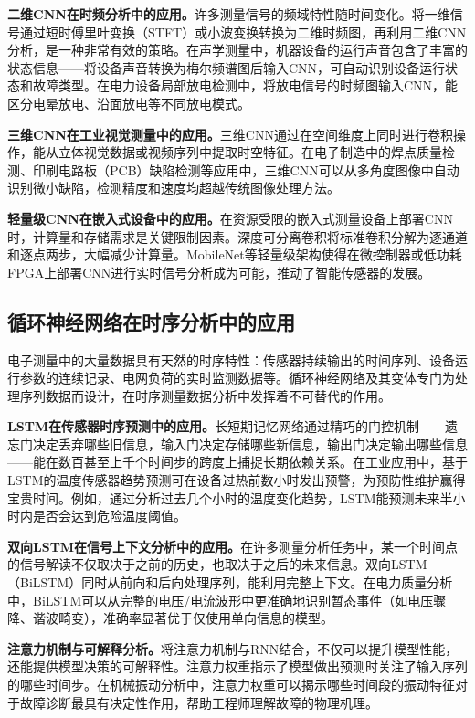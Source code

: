 \documentclass[12pt,a4paper]{article}
\numberwithin{figure}{section}
\numberwithin{table}{section}
\numberwithin{equation}{section}
\begin{document}
\textbf{二维CNN在时频分析中的应用。}许多测量信号的频域特性随时间变化。将一维信号通过短时傅里叶变换（STFT）或小波变换转换为二维时频图，再利用二维CNN分析，是一种非常有效的策略。在声学测量中，机器设备的运行声音包含了丰富的状态信息——将设备声音转换为梅尔频谱图后输入CNN，可自动识别设备运行状态和故障类型。在电力设备局部放电检测中，将放电信号的时频图输入CNN，能区分电晕放电、沿面放电等不同放电模式。

\textbf{三维CNN在工业视觉测量中的应用。}三维CNN通过在空间维度上同时进行卷积操作，能从立体视觉数据或视频序列中提取时空特征。在电子制造中的焊点质量检测、印刷电路板（PCB）缺陷检测等应用中，三维CNN可以从多角度图像中自动识别微小缺陷，检测精度和速度均超越传统图像处理方法。

\textbf{轻量级CNN在嵌入式设备中的应用。}在资源受限的嵌入式测量设备上部署CNN时，计算量和存储需求是关键限制因素。深度可分离卷积将标准卷积分解为逐通道和逐点两步，大幅减少计算量。MobileNet等轻量级架构使得在微控制器或低功耗FPGA上部署CNN进行实时信号分析成为可能，推动了智能传感器的发展。

\subsection{循环神经网络在时序分析中的应用}

电子测量中的大量数据具有天然的时序特性：传感器持续输出的时间序列、设备运行参数的连续记录、电网负荷的实时监测数据等。循环神经网络及其变体专门为处理序列数据而设计，在时序测量数据分析中发挥着不可替代的作用。

\textbf{LSTM在传感器时序预测中的应用。}长短期记忆网络通过精巧的门控机制——遗忘门决定丢弃哪些旧信息，输入门决定存储哪些新信息，输出门决定输出哪些信息——能在数百甚至上千个时间步的跨度上捕捉长期依赖关系。在工业应用中，基于LSTM的温度传感器趋势预测可在设备过热前数小时发出预警，为预防性维护赢得宝贵时间。例如，通过分析过去几个小时的温度变化趋势，LSTM能预测未来半小时内是否会达到危险温度阈值。

\textbf{双向LSTM在信号上下文分析中的应用。}在许多测量分析任务中，某一个时间点的信号解读不仅取决于之前的历史，也取决于之后的未来信息。双向LSTM（BiLSTM）同时从前向和后向处理序列，能利用完整上下文。在电力质量分析中，BiLSTM可以从完整的电压/电流波形中更准确地识别暂态事件（如电压骤降、谐波畸变），准确率显著优于仅使用单向信息的模型。

\textbf{注意力机制与可解释分析。}将注意力机制与RNN结合，不仅可以提升模型性能，还能提供模型决策的可解释性。注意力权重指示了模型做出预测时关注了输入序列的哪些时间步。在机械振动分析中，注意力权重可以揭示哪些时间段的振动特征对于故障诊断最具有决定性作用，帮助工程师理解故障的物理机理。
\end{document}
